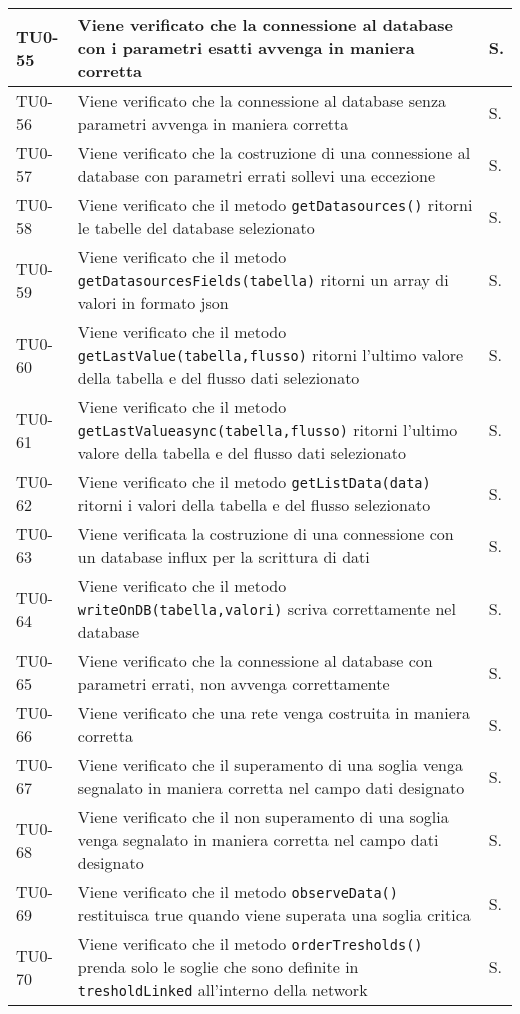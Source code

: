 \begin{longtable}{|C{.15\textwidth}|m{.66\textwidth}|C{.10\textwidth}|}
\hline
{}TU0-55 & Viene verificato che la connessione al database con i parametri esatti avvenga in maniera corretta & S. \\ 
\hline
TU0-56 & Viene verificato che la connessione al database senza parametri avvenga in maniera corretta & S. \\ 
\hline
{}TU0-57 & Viene verificato che la costruzione di una connessione al database con parametri errati sollevi una eccezione & S. \\ 
\hline
TU0-58 & Viene verificato che il metodo \texttt{getDatasources()} ritorni le tabelle del database selezionato & S. \\ 
\hline
{}TU0-59 & Viene verificato che il metodo \texttt{getDatasourcesFields(tabella)} ritorni un array di valori in formato json & S. \\ 
\hline
TU0-60 & Viene verificato che il metodo \texttt{getLastValue(tabella,flusso)} ritorni l'ultimo valore della tabella e del flusso dati selezionato & S. \\ 
\hline
{}TU0-61 & Viene verificato che il metodo \texttt{getLastValueasync(tabella,flusso)} ritorni l'ultimo valore della tabella e del flusso dati selezionato & S. \\ 
\hline
TU0-62 & Viene verificato che il metodo \texttt{getListData(data)} ritorni i valori della tabella e del flusso selezionato & S. \\ 
\hline
{}TU0-63 & Viene verificata la costruzione di una connessione con un database influx per la scrittura di dati & S. \\ 
\hline
TU0-64 & Viene verificato che il metodo \texttt{writeOnDB(tabella,valori)} scriva correttamente nel database & S. \\ 
\hline
{}TU0-65 & Viene verificato che la connessione al database con parametri errati, non avvenga correttamente & S. \\ 
\hline
TU0-66 & Viene verificato che una rete venga costruita in maniera corretta & S. \\ 
\hline
{}TU0-67 & Viene verificato che il superamento di una soglia venga segnalato in maniera corretta nel campo dati designato & S. \\ 
\hline
TU0-68 & Viene verificato che il non superamento di una soglia venga segnalato in maniera corretta nel campo dati designato & S. \\ 
\hline
{}TU0-69 & Viene verificato che il metodo \texttt{observeData()} restituisca true quando viene superata una soglia critica & S. \\ 
\hline
TU0-70 & Viene verificato che il metodo \texttt{orderTresholds()} prenda solo le soglie che sono definite in \texttt{tresholdLinked} all'interno della network & S. \\ 
\hline


\end{longtable}
